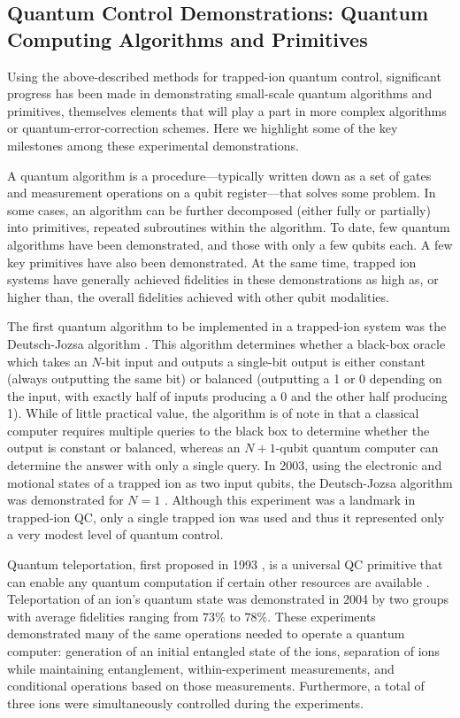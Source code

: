 \documentclass[%
reprint,
 amsmath,amssymb,
]{revtex4-1}
\begin{document}
\subsection{Quantum Control Demonstrations:  Quantum Computing Algorithms and Primitives}
\label{Algorithms}

Using the above-described methods for trapped-ion quantum control, significant progress has been made in demonstrating small-scale quantum algorithms and primitives, themselves elements that will play a part in more complex algorithms or quantum-error-correction schemes.  Here we highlight some of the key milestones among these experimental demonstrations.

A quantum algorithm is a procedure---typically written down as a set of gates and measurement operations on a qubit register---that solves some problem. In some cases, an algorithm can be further decomposed (either fully or partially) into primitives, repeated subroutines within the algorithm. To date, few quantum algorithms have been demonstrated, and those with only a few qubits each. A few key primitives have also been demonstrated. At the same time, trapped ion systems have generally achieved fidelities in these demonstrations as high as, or higher than, the overall fidelities achieved with other qubit modalities.

The first quantum algorithm to be implemented in a trapped-ion system was the Deutsch-Jozsa algorithm \cite{DeutschJozsaAlgorithm}. This algorithm determines whether a black-box oracle which takes an $N$-bit input and outputs a single-bit output is either constant (always outputting the same bit) or balanced (outputting a 1 or 0 depending on the input, with exactly half of inputs producing a 0 and the other half producing 1). While of little practical value, the algorithm is of note in that a classical computer requires multiple queries to the black box to determine whether the output is constant or balanced, whereas an $N+1$-qubit quantum computer can determine the answer with only a single query. In 2003, using the electronic and motional states of a trapped ion as two input qubits, the Deutsch-Jozsa algorithm was demonstrated for $N=1$ \cite{GuldeDeutschJozsa2003}. Although this experiment was a landmark in trapped-ion QC, only a single trapped ion was used and thus it represented only a very modest level of quantum control.

Quantum teleportation, first proposed in 1993 \cite{BennettTeleportation1993}, is a universal QC primitive that can enable any quantum computation if certain other resources are available \cite{GottesmanChuang1999}. Teleportation of an ion's quantum state was demonstrated in 2004 by two groups \cite{BarrettTeleportation2004, RiebeTeleportation2004} with average fidelities ranging from $73 \%$ to $78 \%$. These experiments demonstrated many of the same operations needed to operate a quantum computer: generation of an initial entangled state of the ions, separation of ions while maintaining entanglement, within-experiment measurements, and conditional operations based on those measurements. Furthermore, a total of three ions were simultaneously controlled during the experiments.
\end{document}
